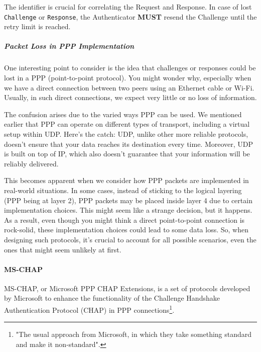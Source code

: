 The identifier is crucial for correlating the Request and Response. In case of lost \texttt{Challenge} or \texttt{Response}, the Authenticator \textbf{MUST} resend the Challenge until the retry limit is reached.



\subparagraph{Packet Loss in PPP Implementation}
One interesting point to consider is the idea that challenges or responses could be lost in a PPP (point-to-point protocol). You might wonder why, especially when we have a direct connection between two peers using an Ethernet cable or Wi-Fi. Usually, in such direct connections, we expect very little or no loss of information.

The confusion arises due to the varied ways PPP can be used. We mentioned earlier that PPP can operate on different types of transport, including a virtual setup within UDP. Here's the catch: UDP, unlike other more reliable protocols, doesn't ensure that your data reaches its destination every time. Moreover, UDP is built on top of IP, which also doesn't guarantee that your information will be reliably delivered.

This becomes apparent when we consider how PPP packets are implemented in real-world situations. In some cases, instead of sticking to the logical layering (PPP being at layer 2), PPP packets may be placed inside layer 4 due to certain implementation choices. This might seem like a strange decision, but it happens. As a result, even though you might think a direct point-to-point connection is rock-solid, these implementation choices could lead to some data loss. So, when designing such protocols, it's crucial to account for all possible scenarios, even the ones that might seem unlikely at first.


\paragraph{MS-CHAP}
MS-CHAP, or Microsoft PPP CHAP Extensions, is a set of protocols developed by Microsoft to enhance the functionality of the Challenge Handshake Authentication Protocol (CHAP) in PPP connections\footnote{"The usual approach from Microsoft, in which they take something standard and make it non-standard".}.


